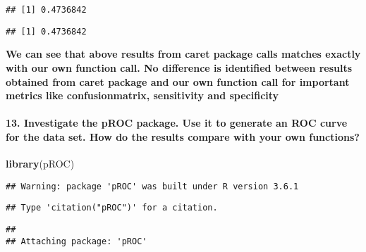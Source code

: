 \documentclass[]{article}
\newenvironment{Shaded}{\begin{snugshade}}{\end{snugshade}}
\newcommand{\DataTypeTok}[1]{\textcolor[rgb]{0.13,0.29,0.53}{#1}}
\newcommand{\KeywordTok}[1]{\textcolor[rgb]{0.13,0.29,0.53}{\textbf{#1}}}
\newcommand{\NormalTok}[1]{#1}
\newcommand{\OperatorTok}[1]{\textcolor[rgb]{0.81,0.36,0.00}{\textbf{#1}}}
\newcommand{\StringTok}[1]{\textcolor[rgb]{0.31,0.60,0.02}{#1}}
\let\oldparagraph\paragraph
\renewcommand{\paragraph}[1]{\oldparagraph{#1}\mbox{}}
\begin{document}
\begin{verbatim}
## [1] 0.4736842
\end{verbatim}

\begin{Shaded}
\end{Shaded}

\begin{verbatim}
## [1] 0.4736842
\end{verbatim}

\textbf{We can see that above results from caret package calls matches
exactly with our own function call. No difference is identified between
results obtained from caret package and our own function call for
important metrics like confusionmatrix, sensitivity and specificity}

\hypertarget{investigate-the-proc-package.-use-it-to-generate-an-roc-curve-for-the-data-set.-how-do-the-results-compare-with-your-own-functions}{%
\paragraph{13. Investigate the pROC package. Use it to generate an ROC
curve for the data set. How do the results compare with your own
functions?}\label{investigate-the-proc-package.-use-it-to-generate-an-roc-curve-for-the-data-set.-how-do-the-results-compare-with-your-own-functions}}

\begin{Shaded}
\begin{Highlighting}[]
\KeywordTok{library}\NormalTok{(pROC)}
\end{Highlighting}
\end{Shaded}

\begin{verbatim}
## Warning: package 'pROC' was built under R version 3.6.1
\end{verbatim}

\begin{verbatim}
## Type 'citation("pROC")' for a citation.
\end{verbatim}

\begin{verbatim}
## 
## Attaching package: 'pROC'
\end{verbatim}
\end{document}
